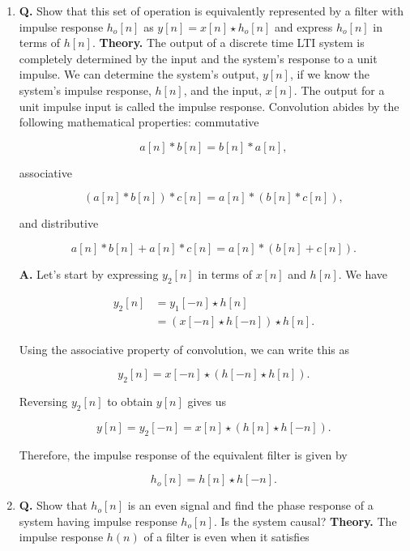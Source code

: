 \documentclass[main.tex]{subfiles}
\begin{document}
\begin{enumerate}
    \begin{enumerate}
        \item \textbf{Q.} Show that this set of operation is equivalently represented by a filter with impulse response $h_{o}[n]$ as $y[n]=x[n] \star h_{o}[n]$ and express $h_{o}[n]$ in terms of $h[n]$. \textbf{Theory.} The output of a discrete time LTI system is completely determined by the input and the system's response to a unit impulse. We can determine the system's output, $y[n]$, if we know the system's impulse response, $h[n]$, and the input, $x[n]$. The output for a unit impulse input is called the impulse response. Convolution abides by the following mathematical properties: commutative 
        
        $$
        a[n] * b[n]=b[n] * a[n],
        $$ 
        
        associative 
        
        $$
        (a[n] * b[n]) * c[n]=a[n] *(b[n] * c[n]),
        $$
        
        and distributive 
        
        $$
        a[n] * b[n]+a[n] * c[n]=a[n] *(b[n]+c[n]).
        $$
        
        \textbf{A.} Let's start by expressing $y_2[n]$ in terms of $x[n]$ and $h[n]$. We have
        
        $$
        \begin{aligned}
        y_2[n]&=y_1[-n] \star h[n] \\
        &=(x[-n] \star h[-n]) \star h[n] .
        \end{aligned}
        $$
        
        Using the associative property of convolution, we can write this as 
        
        $$
        y_2[n]=x[-n] \star(h[-n] \star h[n]).
        $$
        
        Reversing $y_2[n]$ to obtain $y[n]$ gives us 
        
        $$
        y[n]=y_2[-n]=x[n] \star(h[n] \star h[-n]).
        $$
        
        Therefore, the impulse response of the equivalent filter is given by 
        
        $$
        h_o[n]=h[n] \star h[-n].
        $$
        
        \item \textbf{Q.} Show that $h_{o}[n]$ is an even signal and find the phase response of a system having impulse response $h_{o}[n]$. Is the system causal? \textbf{Theory.} The impulse response $h(n)$ of a filter is even when it satisfies 
        

\end{enumerate}
\end{enumerate}
\end{document}
